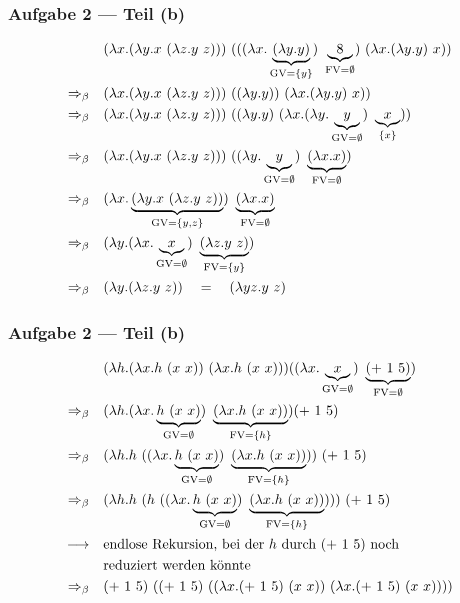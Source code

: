 \documentclass{beamer}
\DeclareMathOperator{\GV}{GV}
\DeclareMathOperator{\FV}{FV}
\begin{document}
\begin{frame} \frametitle{Aufgabe 2 --- Teil (b)}
	\begin{align*}
		& (\lambda x . (\lambda y . x \ (\lambda z . y \ z))) \ (((\lambda x . \underbrace{(\lambda y . y )}_{\GV= \menge{y}}) \ \underbrace{8}_{\FV = \emptyset} ) \ (\lambda x . (\lambda y . y) \ x ))
		\\
		\Rightarrow_\beta \quad
		& (\lambda x . (\lambda y . x \ (\lambda z . y \ z))) \ ((\lambda y . y )) \ (\lambda x . (\lambda y . y) \ x ))
		\\
		\Rightarrow_\beta \quad
		& (\lambda x . (\lambda y . x \ (\lambda z . y \ z))) \ ((\lambda y . y ) \ (\lambda x . (\lambda y . \underbrace{y}_{\GV=\emptyset}) \ \underbrace{x}_{\menge{x}} ))
		\\
		\Rightarrow_\beta \quad
		& (\lambda x . (\lambda y . x \ (\lambda z . y \ z))) \ ((\lambda y . \underbrace{y}_{\GV = \emptyset} ) \ \underbrace{(\lambda x . x)}_{\FV = \emptyset})
		\\
		\Rightarrow_\beta \quad
		& (\lambda x . \underbrace{(\lambda y . x \ (\lambda z . y \ z))}_{\GV = \menge{y,z}}) \ \underbrace{(\lambda x . x)}_{\FV = \emptyset}
		\\
		\Rightarrow_\beta \quad
		& (\lambda y . (\lambda x . \underbrace{x}_{\GV = \emptyset}) \ \underbrace{(\lambda z . y \ z)}_{\FV = \menge{y}})
		\\
		\Rightarrow_\beta \quad
		& (\lambda y . (\lambda z . y \ z)) 
		\quad = \quad
		(\lambda yz . y \ z) 
	\end{align*}
\end{frame}

\begin{frame} \frametitle{Aufgabe 2 --- Teil (b)}
	\begin{align*}
		& (\lambda h . (\lambda x . h \ (x \ x)) \ (\lambda x . h \ (x \ x))) ((\lambda x . \underbrace{x}_{\GV = \emptyset}) \ \underbrace{(+ \ 1 \ 5)}_{ \FV = \emptyset})
		\\
		\Rightarrow_\beta \quad
		& (\lambda h . (\lambda x . \underbrace{h \ (x \ x)}_{\GV = \emptyset}) \ \underbrace{(\lambda x . h \ (x \ x))}_{\FV = \menge{h}}) (+ \ 1 \ 5)
		\\
		\Rightarrow_\beta \quad
		& (\lambda h . h \ ((\lambda x . \underbrace{h \ (x \ x)}_{\GV = \emptyset}) \ \underbrace{(\lambda x . h \ (x \ x))}_{\FV= \menge{h}})) \ (+ \ 1 \ 5)
		\\
		\Rightarrow_\beta \quad
		& (\lambda h . h \ ( h \ ((\lambda x . \underbrace{h \ (x \ x)}_{\GV = \emptyset}) \ \underbrace{(\lambda x . h \ (x \ x))}_{\FV= \menge{h}}))) \ (+ \ 1 \ 5)
		\\
		\longrightarrow \quad
		&\text{endlose Rekursion, bei der $h$ durch $(+ \ 1 \ 5 )$ noch} \\
		&\text{reduziert werden könnte}
		\\
		\Rightarrow_\beta \quad
		& (+ \ 1 \ 5) \ ( (+ \ 1 \ 5) \ ((\lambda x . (+ \ 1 \ 5 ) \ (x \ x)) \ (\lambda x . (+ \ 1 \ 5 ) \ (x \ x))))	
	\end{align*}
\end{frame}
\end{document}
